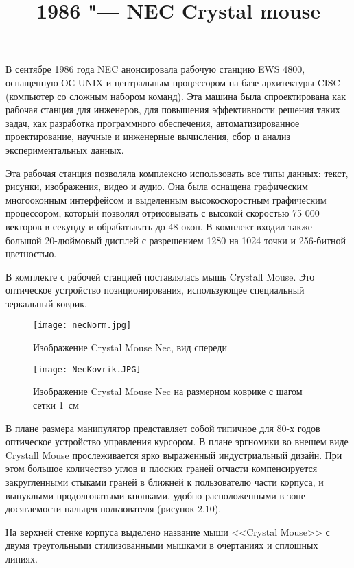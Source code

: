 \documentclass[11pt, a4paper]{article}
\begin{document}
\title{1986 "--- NEC Crystal mouse}
\date{}
\maketitle

    В сентябре 1986 года NEC анонсировала рабочую станцию EWS 4800, оснащенную ОС UNIX и центральным процессором на базе архитектуры CISC (компьютер со сложным набором команд). Эта машина была спроектирована как рабочая станция для инженеров, для повышения эффективности решения таких задач, как разработка программного обеспечения, автоматизированное проектирование, научные и инженерные вычисления, сбор и анализ экспериментальных данных.
    
    Эта рабочая станция позволяла комплексно использовать все типы данных: текст, рисунки, изображения, видео и аудио. Она была оснащена графическим многооконным интерфейсом и выделенным высокоскоростным графическим процессором, который позволял отрисовывать с высокой скоростью 75 000 векторов в секунду и обрабатывать до 48 окон. В комплект входил также большой 20-дюймовый дисплей с разрешением 1280 на 1024 точки и 256-битной цветностью.
    
    В комплекте с рабочей станцией поставлялась мышь Crystall Mouse. Это оптическое устройство позиционирования, использующее специальный зеркальный коврик. 

\begin{figure}[h]
    \centering
    \texttt{[image: necNorm.jpg]}
    \caption{Изображение Crystal Mouse Nec, вид спереди}
    \label{fig:NecCrystalPic}
\end{figure}

\begin{figure}[h]
    \centering
    \texttt{[image: NecKovrik.JPG]}
    \caption{Изображение Crystal Mouse Nec на размерном коврике с шагом сетки 1~см}
    \label{fig:NecCrystalSize}
\end{figure}

В плане размера манипулятор представляет собой типичное для 80-х годов оптическое устройство управления курсором. 
    В плане эргномики во внешем виде Crystall Mouse прослеживается ярко выраженный индустриальный дизайн. При этом большое количество углов и плоских граней отчасти компенсируется закругленными стыками граней в ближней к пользователю части корпуса, и выпуклыми продолговатыми кнопками, удобно расположенными в зоне досягаемости пальцев пользователя (рисунок 2.10).

На верхней стенке корпуса выделено название мыши <<Crystal Mouse>> с двумя треугольными стилизованными мышками в очертаниях и сплошных линиях.
\end{document}
